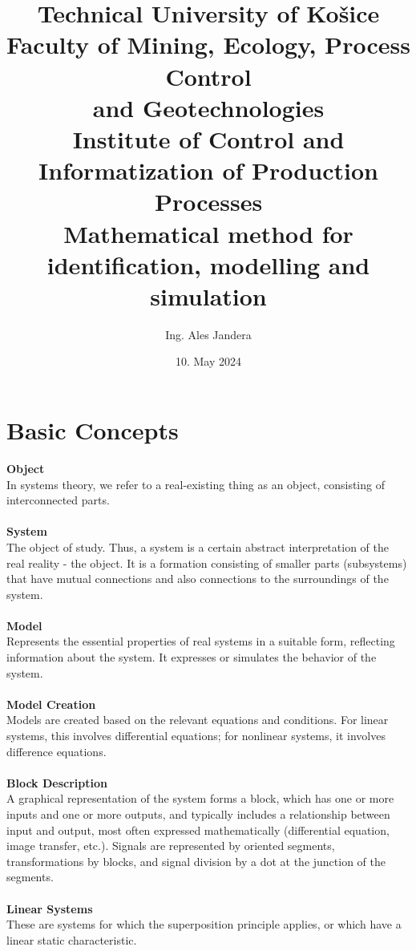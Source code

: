 \documentclass[12pt]{article}
\title{
{\textbf{Technical University of Košice}}\\
\vspace{12pt}
{\large \textbf{Faculty of Mining, Ecology, Process Control\\ and Geotechnologies}}\\
\vspace{12pt}
{\large Institute of Control and Informatization of Production Processes}\\
\vspace{64pt}
{\textbf{Mathematical method for identification, modelling and simulation}}\\
}
\author{Ing. Ales Jandera}
\date{10. May 2024}
\begin{document}
\maketitle

\newpage

\tableofcontents

\newpage

\section{Basic Concepts}

\textbf{Object}\\
In systems theory, we refer to a real-existing thing as an object, consisting of
interconnected parts.\\
\\
\textbf{System}\\
The object of study. Thus, a system is a certain abstract interpretation of the real
reality - the object. It is a formation consisting of smaller parts (subsystems) that
have mutual connections and also connections to the surroundings of the system.\\
\\
\textbf{Model}\\
Represents the essential properties of real systems in a suitable form, reflecting
information about the system. It expresses or simulates the behavior of the system.\\
\\
\textbf{Model Creation}\\
Models are created based on the relevant equations and conditions. For linear systems,
this involves differential equations; for nonlinear systems, it involves difference
equations.\\
\\
\textbf{Block Description}\\
A graphical representation of the system forms a block, which has one or more inputs
and one or more outputs, and typically includes a relationship between input and output,
most often expressed mathematically (differential equation, image transfer, etc.).
Signals are represented by oriented segments, transformations by blocks, and signal
division by a dot at the junction of the segments.\\
\\
\textbf{Linear Systems}\\
These are systems for which the superposition principle applies, or which have a
linear static characteristic.\\
\end{document}
